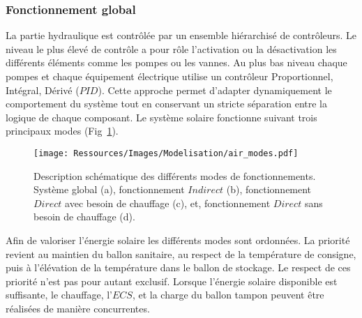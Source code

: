 \subsubsection{Fonctionnement global} %
\label{ssub:fonctionnement_global}
La partie hydraulique est contrôlée par un ensemble hiérarchisé de contrôleurs. Le niveau
le plus élevé de contrôle a pour rôle l’activation ou la désactivation les différents
éléments comme les pompes ou les vannes. Au plus bas niveau chaque pompes et chaque
équipement électrique utilise un contrôleur Proportionnel, Intégral, Dérivé ($PID$). Cette
approche permet d’adapter dynamiquement le comportement du système tout en conservant un
stricte séparation entre la logique de chaque composant. Le système solaire fonctionne
suivant trois principaux modes
(Fig~\ref{fig:schema_modes}).
\begin{figure}
    \begin{center}
        \texttt{[image: Ressources/Images/Modelisation/air\_modes.pdf]}
    \end{center}
    \caption{Description schématique des différents modes de fonctionnements. Système
    global (a), fonctionnement $Indirect$ (b), fonctionnement $Direct$ avec besoin de
    chauffage (c), et, fonctionnement $Direct$ sans besoin de chauffage (d).
             \label{fig:schema_modes}}
\end{figure}

Afin de valoriser l’énergie solaire les différents modes sont ordonnées. La priorité
revient au maintien du ballon sanitaire, au respect de la température de consigne, puis à
l’élévation de la température dans le ballon de stockage. Le respect de ces priorité n’est
pas pour autant exclusif. Lorsque l’énergie solaire disponible est suffisante, le
chauffage, l’$ECS$, et la charge du ballon tampon peuvent être réalisées de manière
concurrentes.


